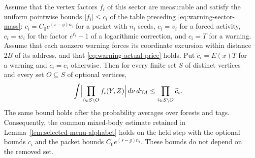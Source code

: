 \begin{lemma}
\label{lem:selected-residual-body}
Assume that the vertex factors $f_i$ of this sector are measurable and
satisfy the uniform pointwise bounds $|f_i|\le c_i$ of the table
preceding \eqref{eq:warning-sector-mass}: $c_i=C_0e^{(s-g)n_i}$ for a
packet with $n_i$ seeds, $c_i=v_i$ for a forced activity, $c_i=w_i$ for
the factor $e^{\ell_i}-1$ of a logarithmic correction, and $c_i=T$ for
a warning. Assume that each nonzero warning forces its coordinate
excursion within distance $2B$ of its address, and that
\eqref{eq:warning-actual-price} holds. Put $\widetilde c_i=E(x)T$ for
a warning and $\widetilde c_i=c_i$ otherwise. Then for every finite set
$S$ of distinct vertices and every set $O\subseteq S$ of optional
vertices,
\begin{equation}\label{eq:selected-residual-body}
 \int\Bigl|\prod_{i\in S\setminus O}f_i(Y,Z)\Bigr|
        \,d\nu\,d\gamma_A
 \le\prod_{i\in S\setminus O}\widetilde c_i .
\end{equation}
The same bound holds after the probability averages over forests and
tags. Consequently, the common mixed-body estimate retained in
Lemma~\ref{lem:selected-menu-alphabet} holds on the held step with the
optional bounds $\widetilde c_i$ and the packet bounds
$C_0e^{(s-g)n_i}$. These bounds do not depend on the removed set.
\end{lemma}

